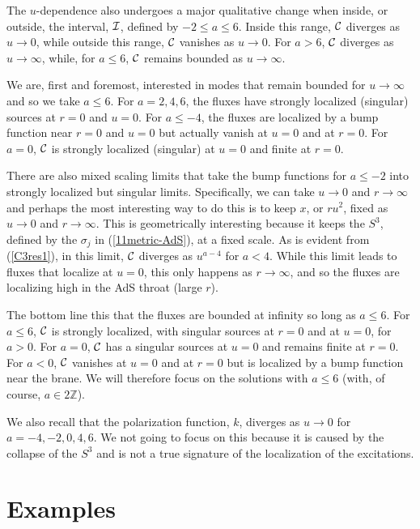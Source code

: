 \documentclass[11pt]{article}
\def\ZZ{\mathbb{Z}}
\def\cC{{\cal C}}
\def\cI{{\cal I}}
\numberwithin{equation}{section}
\begin{document}
The $u$-dependence also undergoes a major qualitative change when inside, or outside, the interval, $\cI$, defined by $-2 \le a \le 6$.  Inside this range, $\cC$ diverges as $u \to 0$, while outside this range, $\cC$ vanishes as $u \to 0$.   For $a > 6$, $\cC$ diverges as $u \to \infty$,  while, for $a \le 6$,  $\cC$ remains bounded as $u \to \infty$. 

We are, first and foremost, interested in modes that remain bounded for $u \to  \infty$  and so we take $a \le 6$.   For $a=2,4,6$, the fluxes have strongly localized (singular) sources at $r=0$ and $u=0$.  For $a\le -4$, the fluxes are localized by a bump function near  $r=0$ and $u=0$ but actually vanish at $u=0$ and at $r=0$.  For $a =0$, $\cC$ is  strongly localized (singular) at  $u=0$ and finite at $r=0$.   

There are also mixed scaling limits that take the bump functions for $a\le -2$ into strongly localized but singular limits.  Specifically, we can take $u \to 0$ and $r \to \infty$ and perhaps the most interesting way to do this is to keep $x$, or $r u^2$, fixed as  $u \to 0$ and $r \to \infty$.  This is geometrically interesting because it keeps the $S^3$,  defined by the $\sigma_j$ in  (\ref{11metric-AdS}), at a fixed scale.  As is evident from (\ref{C3res1}), in this limit, $\cC$ diverges as $u^{a-4}$ for $a <4$.
While this limit leads to fluxes that localize at $u=0$, this only happens as $r \to \infty$, and so the fluxes are localizing high in the AdS throat (large $r$).

The bottom line this that the fluxes are bounded at infinity so long as $a \le 6$.  For  $a \le 6$, $\cC$ is  strongly localized, with singular sources at $r=0$ and at $u=0$, for $a>0$.  For $a =0$, $\cC$ has a singular sources at $u=0$ and remains finite at $r=0$.  For $ a < 0$,   $\cC$ vanishes at $u=0$ and at $r=0$ but is localized by a bump function near the brane.  We will therefore focus on the solutions with $a \le 6$  (with, of course, $a \in 2\ZZ$).

We also recall that the polarization function, $k$, diverges as $u \to 0$ for $a=-4,-2,0,4,6$.  We not going to focus on this because it is caused by the collapse of the $S^3$ and is not a true signature of the localization of the excitations.

\section{Examples}
\label{sec:Examples}
\end{document}

